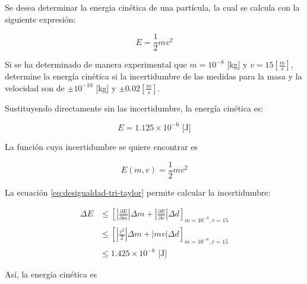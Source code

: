\begin{ex}
	
	Se desea determinar la energia cinética de una partícula, la cual se
	calcula con la siguiente expresión:

	\begin{equation*}
		E = \frac{1}{2} m v^2
	\end{equation*}

	Si se ha determinado de manera experimental que \(m = 10^{-8}\) [kg] y $v
	= 15 [\frac{m}{s}]$, determine la energía cinética si la incertidumbre
	de las medidas para la masa y la velocidad son de $\pm 10^{-10}$ [kg] y
	$\pm 0.02 [\frac{m}{s}]$.

	\begin{solution}

		Sustituyendo directamente sin las incertidumbre, la energía
		cinética es:

		\begin{equation*}
			E = 1.125 \times 10^{-6} \text{ [J]}
		\end{equation*}

		La función cuya incertidumbre se quiere encontrar es

		\begin{equation*}
			E(m, v) = \frac{1}{2} m v^2
		\end{equation*}

		La ecuación \ref{eq:desigualdad-tri-taylor} permite calcular la
		incertidumbre:

		\begin{align*}
			\Delta E &\leq \left[ \left| \frac{\partial E}{\partial m}
			\right| \Delta m + \left| \frac{\partial E}{\partial v}
		\right| \Delta d \right]_{m = 10^{-8}, v = 15}\\
				 &\leq \left[ \left| \frac{v^2}{2}
			\right| \Delta m + \left| m v \right| \Delta d 
		\right]_{m = 10^{-8}, v = 15} \\
				 &\leq 1.425 \times 10^{-8} \text{ [J]}
		\end{align*}

		Así, la energía cinética es

		\begin{center}
		\end{center}

	\end{solution}
\end{ex}
